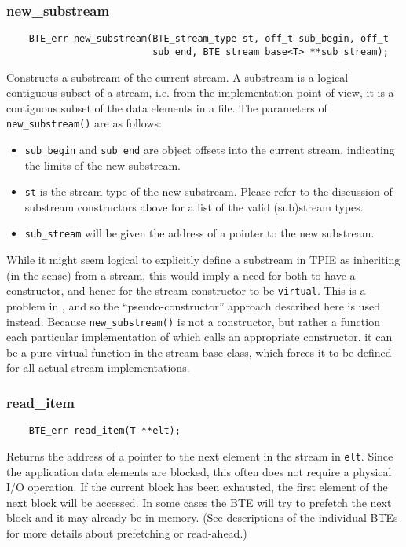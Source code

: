 \subsubsection{new\_substream}
\begin{lstlisting}
    BTE_err new_substream(BTE_stream_type st, off_t sub_begin, off_t
                          sub_end, BTE_stream_base<T> **sub_stream);
\end{lstlisting}

Constructs a substream of the current stream.  A substream is a
logical contiguous subset of a stream, i.e. from the implementation
point of view, it is a contiguous subset of the data elements in a
file.  The parameters of \lstinline|new_substream()| are as follows:
\begin{itemize}
\item \lstinline|sub_begin| and \lstinline|sub_end| are object offsets
  into the current stream, indicating the limits of the new substream.
    
\item \lstinline|st| is the stream type of the new substream. Please
  refer to the discussion of substream constructors above for a list
  of the valid (sub)stream types.
  
\item \lstinline|sub_stream| will be given the address of a pointer to
  the new substream.
\end{itemize}

While it might seem logical to explicitly define a substream in TPIE
as inheriting (in the \CPP{} sense) from a stream, this would imply a
need for both to have a constructor, and hence for the stream
constructor to be \lstinline|virtual|. This is a problem in
\CPP{},  and so the ``pseudo-constructor'' approach
described here is used instead.  Because \lstinline|new_substream()| is not a
constructor, but rather a function each particular implementation of
which calls an appropriate constructor, it can be a pure virtual
function in the stream base class, which forces it to be defined for
all actual stream implementations. 

\subsubsection{read\_item}
\begin{lstlisting}
    BTE_err read_item(T **elt);
\end{lstlisting}
Returns the address of a pointer to the next element in the stream in
\lstinline|elt|. Since the application data elements are blocked, this
often does not require a physical I/O operation. If the current block
has been exhausted, the first element of the next block will be
accessed. In some cases the BTE will try to prefetch the next block
and it may already be in memory. (See descriptions of the individual
BTEs for more details about prefetching or read-ahead.)

